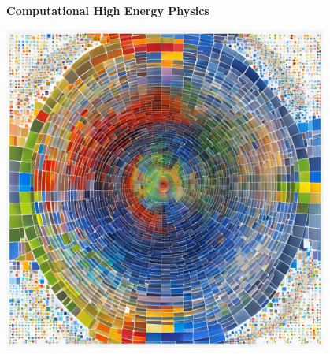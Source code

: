 
\begin{titlepage}
   \begin{center}
       \vspace*{3cm}
        \Huge
       \textbf{Computational High Energy Physics}
       
       \vspace{0.5cm}
         \LARGE
       \vspace{1cm}
       \vfill
    \vspace{2cm}
       \vfill
             \Large
\includegraphics[width=0.8\textwidth]{tex/ims/numcol.png}
       \vspace{0.8cm}
   \end{center}
\end{titlepage}
